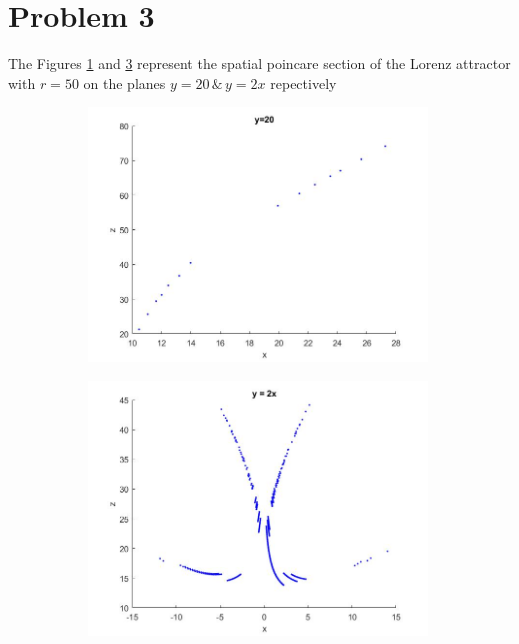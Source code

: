 \documentclass{article}
\begin{document}
\begin{enumerate}[label=(\alph*)]
\begin{minipage}{\linewidth}
{\begin{table}[H]
\begin{tabular}{|c|c|}
    \hline
\end{tabular}
\end{table}
}
\end{minipage}

\end{enumerate}

\section*{Problem 3}
The Figures \ref{fig:prob3a} and \ref{fig:prob3b} represent the spatial poincare section of the Lorenz attractor with $r=50$ on the planes $y=20 \,\&\, y=2x$ repectively\par\medskip
\begin{figure}[H]
\centering 
\begin{subfigure}{.5\textwidth}
\includegraphics[width=90mm]{images/prob3a.jpg}
\label{fig:prob3a}
\end{subfigure}%
\begin{subfigure}{.5\textwidth}
\includegraphics[width=90mm]{images/prob3b.jpg}
\label{fig:prob3b}
\end{subfigure}
\end{figure}
\end{document}
